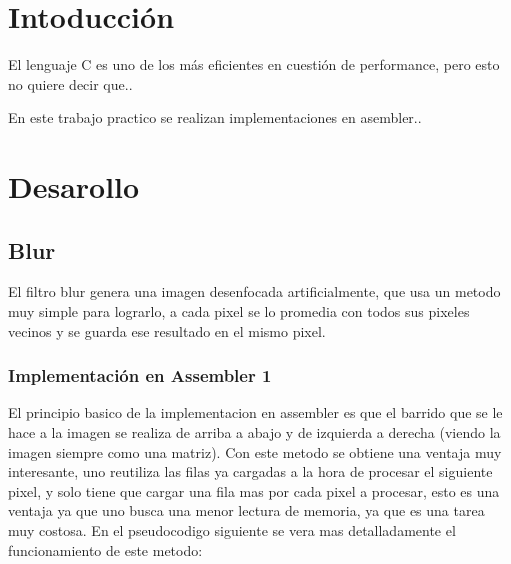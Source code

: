 \documentclass[a4paper]{article}
\begin{document}
\section{Intoducción}

El lenguaje C es uno de los más eficientes en cuestión de performance, pero esto no quiere decir que..

En este trabajo practico se realizan implementaciones en asembler..

\section{Desarollo}

%
%
\subsection{Blur}

El filtro blur genera una imagen desenfocada artificialmente, que usa un metodo muy simple para lograrlo, a cada pixel se lo promedia con todos sus pixeles vecinos y se guarda ese resultado en el mismo pixel.

\subsubsection{Implementación en Assembler 1}

El principio basico de la implementacion en assembler es que el barrido que se le hace a la imagen se realiza de arriba a abajo y de izquierda a derecha (viendo la imagen siempre como una matriz). Con este metodo se obtiene una ventaja muy interesante, uno reutiliza las filas ya cargadas a la hora de procesar el siguiente pixel, y solo tiene que cargar una fila mas por cada pixel a procesar, esto es una ventaja ya que uno busca una menor lectura de memoria, ya que es una tarea muy costosa. En el pseudocodigo siguiente se vera mas detalladamente el funcionamiento de este metodo:

\end{document}
